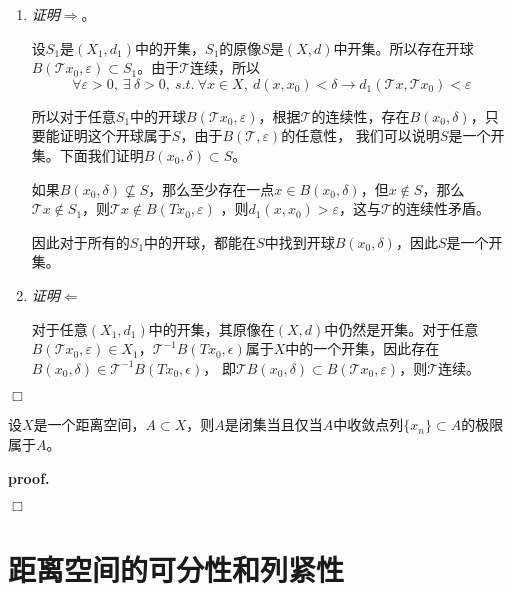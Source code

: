 \begin{enumerate}
    \item \textsl{证明$\Rightarrow$}。
    
    设$S_1$是$(X_1,d_1)$中的开集，$S_1$的原像$S$是$(X,d)$中开集。所以存在开球$B(\mathcal{T}x_0,\varepsilon)\subset S_1$。由于$\mathcal{T}$连续，所以
    \begin{equation}
        \forall \varepsilon>0,\ \exists\ \delta>0,\ s.t.\ \forall x\in X,\ d(x,x_0)<\delta\rightarrow d_1(\mathcal{T}x,\mathcal{T}x_0)<\varepsilon
    \end{equation}

    所以对于任意$S_1$中的开球$B(\mathcal{T}x_0,\varepsilon)$，根据$\mathcal{T}$的连续性，存在$B(x_0,\delta)$，只要能证明这个开球属于$S$，由于$B(\mathcal{T},\varepsilon)$的任意性，
    我们可以说明$S$是一个开集。下面我们证明$B(x_0,\delta)\subset S$。

    如果$B(x_0,\delta)\nsubseteq S$，那么至少存在一点$x\in B(x_0,\delta)$，但$x\notin S$，那么$\mathcal{T}x\notin S_1$，则$\mathcal{T}x\notin B(Tx_0,\varepsilon)$
    ，则$d_1(x,x_0)>\varepsilon$，这与$\mathcal{T}$的连续性矛盾。

    因此对于所有的$S_1$中的开球，都能在$S$中找到开球$B(x_0,\delta)$，因此$S$是一个开集。

    \item \textsl{证明$\Leftarrow$}
    
    对于任意$(X_1,d_1)$中的开集，其原像在$(X,d)$中仍然是开集。对于任意$B(\mathcal{T}x_0,\varepsilon)\in X_1$，$\mathcal{T}^{-1}B(Tx_0,\epsilon)$属于$X$中的一个开集，因此存在$B(x_0,\delta)\in \mathcal{T}^{-1}B(Tx_0,\epsilon)$，
    即$\mathcal{T}B(x_0,\delta)\subset B(\mathcal{T}x_0,\varepsilon)$，则$\mathcal{T}$连续。

\end{enumerate}

$\Box$

\begin{mdframed}
    \begin{theorem}
        设$X$是一个距离空间，$A\subset X$，则$A$是闭集当且仅当$A$中收敛点列$\{x_n\}\subset A$的极限属于$A$。
    \end{theorem}
\end{mdframed}
\textbf{proof.}

$\Box$

\section{距离空间的可分性和列紧性}

